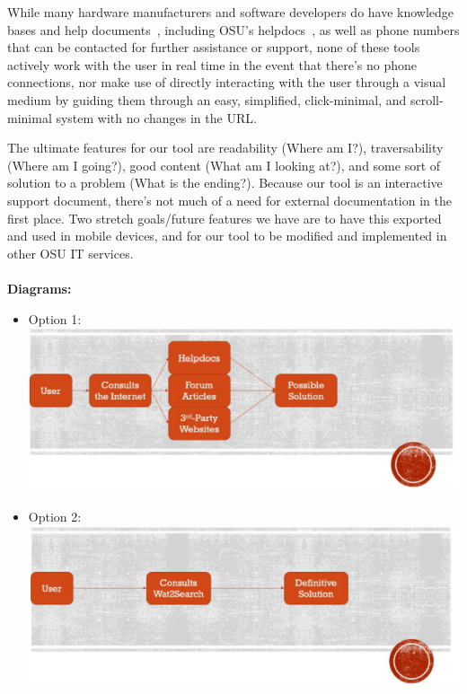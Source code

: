 \documentclass[12pt, letterpaper]{article}
\begin{document}
	While many hardware manufacturers and software developers do have knowledge bases and help documents~\cite{gcflearnfree}, including OSU’s helpdocs~\cite{OSUHD}, as well as phone numbers that can be contacted for further assistance or support, none of these tools actively work with the user in real time in the event that there’s no phone connections, nor make use of directly interacting with the user through a visual medium by guiding them through an easy, simplified, click-minimal, and scroll-minimal system with no changes in the URL.
	
	The ultimate features for our tool are readability (Where am I?), traversability (Where am I going?), good content (What am I looking at?), and some sort of solution to a problem (What is the ending?). Because our tool is an interactive support document, there’s not much of a need for external documentation in the first place. Two stretch goals/future features we have are to have this exported and used in mobile devices, and for our tool to be modified and implemented in other OSU IT services.
	\\\\\textbf{Diagrams:}
	\begin{itemize}
		\item Option 1:
		\\\includegraphics[scale=.75]{option1.png}
		\item Option 2:
		\\\includegraphics[scale=.75]{option2.png}
	\end{itemize}
\end{document}
